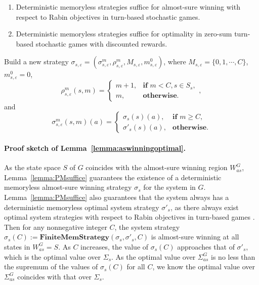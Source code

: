 \documentclass[runningheads,a4paper]{llncs}
\begin{document}
\begin{lemma}
\begin{enumerate}
\item \cite{chatterjee2005complexity} Deterministic memoryless strategies suffice for almost-sure winning with respect to Rabin objectives in turn-based stochastic games. 
\item \cite{filar1996competitive} Deterministic memoryless strategies suffice for optimality in zero-sum turn-based stochastic games with discounted rewards.
\end{enumerate}
\label{lemma:PMsuffice}
\end{lemma}

\begin{algorithm}[!t]
\begin{algorithmic}
    \State Build a new strategy $\sigma_{s,\varepsilon} = (\sigma^m_{s,\varepsilon}, \rho^m_{s,\varepsilon}, M_{s, \varepsilon}, m^0_{s,\varepsilon})$, where $M_{s, \varepsilon} = \{0, 1, \cdots, C\}$, $m^0_{s,\varepsilon} = 0$, 
    \[\rho^m_{s,\varepsilon}(s, m) = 
            \begin{cases}
                m+1,& \textbf{if } m < C, s \in S_s, \\
                m,& \textbf{otherwise.}
            \end{cases},
        \] and \[\sigma^m_{s,\varepsilon}(s,m)(a) = 
            \begin{cases}
                \sigma_s(s)(a),& \textbf{if }m \geq C, \\
                \sigma'_s(s)(a),& \textbf{otherwise}.
            \end{cases}
    \]
\label{alg:FiniteMemStrategy}
\EndFunction
\end{algorithmic}
\end{algorithm}

\paragraph{Proof sketch of Lemma~\ref{lemma:aswinningoptimal}.} 
As the state space $S$ of $G$ coincides with the almost-sure winning region $W_{as}^G$, Lemma~\ref{lemma:PMsuffice} guarantees the existence of a deterministic memoryless almost-sure winning strategy $\sigma_s$ for the system in $G$. 
Lemma~\ref{lemma:PMsuffice} also guarantees that the system always has a deterministic memoryless optimal system strategy $\sigma'_s$, as there always exist optimal system strategies with respect to Rabin objectives in turn-based games \cite{filar1996competitive}. 
Then for any nonnegative integer $C$, the system strategy $\sigma_s(C) := \textbf{FiniteMemStrategy}(\sigma_s, \sigma'_s, C)$ is almost-sure winning at all states in $W_{as}^G = S$. As $C$ increases, the value of $\sigma_s(C)$ approaches that of $\sigma'_s$, which is the optimal value over $\Sigma_s$. As the optimal value over $\Sigma_{as}^G$ is no less than the supremum of the values of $\sigma_s(C)$ for all $C$, we know the optimal value over $\Sigma_{as}^G$ coincides with that over $\Sigma_s$.
\end{document}
